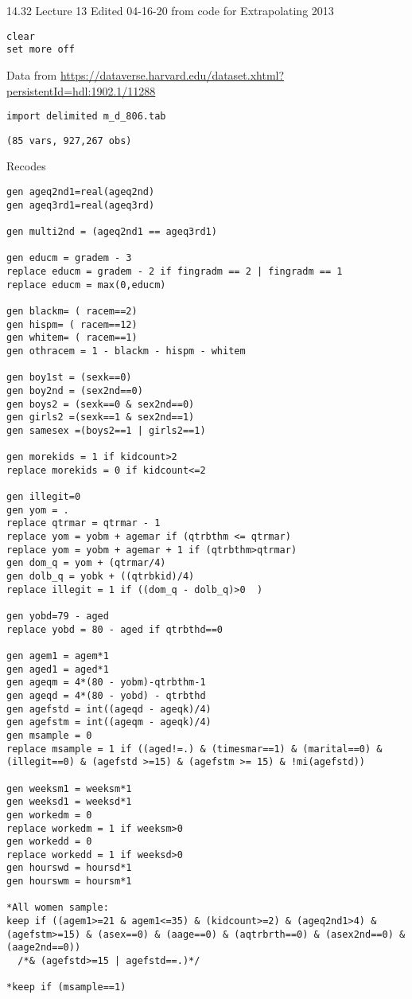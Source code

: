 \documentclass[cache=false]{article}
\date{\today}
\title{}
\begin{document}
\centering

14.32 Lecture 13
Edited 04-16-20 from code for Extrapolating 2013

\begin{verbatim}
clear
set more off
\end{verbatim}

Data from \url{https://dataverse.harvard.edu/dataset.xhtml?persistentId=hdl:1902.1/11288}

\begin{verbatim}
import delimited m_d_806.tab
\end{verbatim}

\begin{verbatim}
(85 vars, 927,267 obs)
\end{verbatim}


Recodes
\begin{verbatim}
gen ageq2nd1=real(ageq2nd)
gen ageq3rd1=real(ageq3rd)

gen multi2nd = (ageq2nd1 == ageq3rd1)

gen educm = gradem - 3
replace educm = gradem - 2 if fingradm == 2 | fingradm == 1
replace educm = max(0,educm)

gen blackm= ( racem==2)
gen hispm= ( racem==12)
gen whitem= ( racem==1)
gen othracem = 1 - blackm - hispm - whitem

gen boy1st = (sexk==0)
gen boy2nd = (sex2nd==0)
gen boys2 = (sexk==0 & sex2nd==0)
gen girls2 =(sexk==1 & sex2nd==1)
gen samesex =(boys2==1 | girls2==1)

gen morekids = 1 if kidcount>2
replace morekids = 0 if kidcount<=2

gen illegit=0
gen yom = .
replace qtrmar = qtrmar - 1 
replace yom = yobm + agemar if (qtrbthm <= qtrmar) 
replace yom = yobm + agemar + 1 if (qtrbthm>qtrmar) 
gen dom_q = yom + (qtrmar/4) 
gen dolb_q = yobk + ((qtrbkid)/4) 
replace illegit = 1 if ((dom_q - dolb_q)>0	) 

gen yobd=79 - aged
replace yobd = 80 - aged if qtrbthd==0

gen agem1 = agem*1
gen aged1 = aged*1
gen ageqm = 4*(80 - yobm)-qtrbthm-1
gen ageqd = 4*(80 - yobd) - qtrbthd
gen agefstd = int((ageqd - ageqk)/4)
gen agefstm = int((ageqm - ageqk)/4)
gen msample = 0
replace msample = 1 if ((aged!=.) & (timesmar==1) & (marital==0) & (illegit==0) & (agefstd >=15) & (agefstm >= 15) & !mi(agefstd))

gen weeksm1 = weeksm*1
gen weeksd1 = weeksd*1
gen workedm = 0
replace workedm = 1 if weeksm>0
gen workedd = 0
replace workedd = 1 if weeksd>0
gen hourswd = hoursd*1
gen hourswm = hoursm*1

*All women sample:
keep if ((agem1>=21 & agem1<=35) & (kidcount>=2) & (ageq2nd1>4) & (agefstm>=15) & (asex==0) & (aage==0) & (aqtrbrth==0) & (asex2nd==0) & (aage2nd==0))
  /*& (agefstd>=15 | agefstd==.)*/

*keep if (msample==1)

\end{verbatim}
\end{document}
